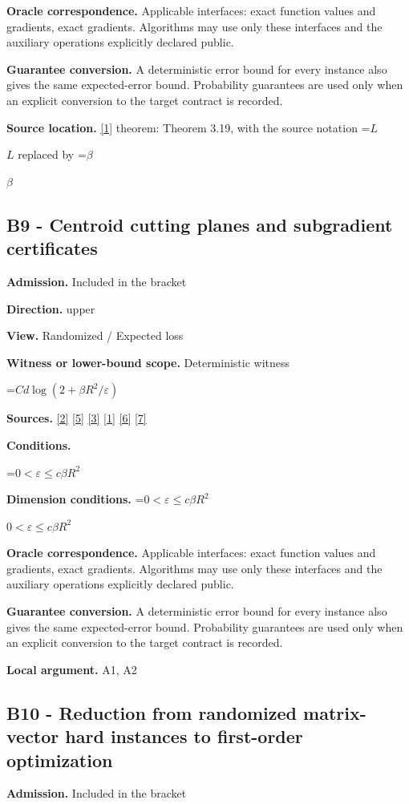 \documentclass[10pt,a4paper]{article}
\newcommand{\AtlasMath}[1]{\par\begingroup\centering\setbox0=\hbox{$\displaystyle #1$}\ifdim\wd0>1.4\linewidth\typeout{ATLAS WIDE FORMULA: \the\wd0}\fi\ifdim\wd0>\linewidth\resizebox{\linewidth}{!}{\box0}\else\box0\fi\par\endgroup}
\newcommand{\AtlasInlineMath}[1]{\begingroup\setbox0=\hbox{$#1$}\ifdim\wd0>.4\linewidth\endgroup\AtlasMath{#1}\else\endgroup$#1$\fi}
\begin{document}
\textbf{Oracle correspondence.} Applicable interfaces: exact function values and gradients, exact gradients. Algorithms may use only these interfaces and the auxiliary operations explicitly declared public.

\textbf{Guarantee conversion.} A deterministic error bound for every instance also gives the same expected-error bound. Probability guarantees are used only when an explicit conversion to the target contract is recorded.

\textbf{Source location.} \href{https://arxiv.org/pdf/1405.4980}{[1]} theorem: Theorem 3.19, with the source notation \AtlasInlineMath{L} replaced by \AtlasInlineMath{\beta}

\subsection{B9 - Centroid cutting planes and subgradient certificates}
\textbf{Admission.} Included in the bracket

\textbf{Direction.} upper

\textbf{View.} Randomized / Expected loss

\textbf{Witness or lower-bound scope.} Deterministic witness

\AtlasMath{C d\log(2+\beta R^2/\varepsilon)}
\textbf{Sources.} \href{https://arxiv.org/pdf/2101.09740v2}{[2]} \href{https://arxiv.org/pdf/2609.33360v2}{[5]} \href{https://arxiv.org/pdf/2609.10874}{[3]} \href{https://arxiv.org/pdf/1405.4980}{[1]} \href{https://www2.isye.gatech.edu/~nemirovs/MOR_AccuracyCertificates.pdf}{[6]} \href{https://arxiv.org/pdf/2609.20701}{[7]}

\textbf{Conditions.} 
\AtlasMath{0<\varepsilon\le c\beta R^2}


\textbf{Dimension conditions.} \AtlasInlineMath{0<\varepsilon\le c\beta R^2}

\textbf{Oracle correspondence.} Applicable interfaces: exact function values and gradients, exact gradients. Algorithms may use only these interfaces and the auxiliary operations explicitly declared public.

\textbf{Guarantee conversion.} A deterministic error bound for every instance also gives the same expected-error bound. Probability guarantees are used only when an explicit conversion to the target contract is recorded.

\textbf{Local argument.} A1, A2

\subsection{B10 - Reduction from randomized matrix-vector hard instances to first-order optimization}
\textbf{Admission.} Included in the bracket
\end{document}
